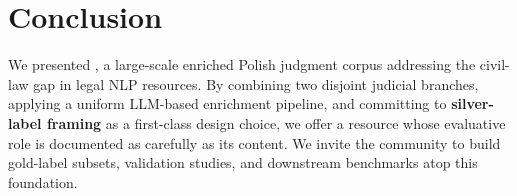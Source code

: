 
\section{Conclusion}
\label{sec:conclusion}

We presented \juddgespl{}, a large-scale enriched Polish judgment corpus addressing the civil-law gap in legal NLP resources. By combining two disjoint judicial branches, applying a uniform LLM-based enrichment pipeline, and committing to \textbf{silver-label framing} as a first-class design choice, we offer a resource whose evaluative role is documented as carefully as its content. We invite the community to build gold-label subsets, validation studies, and downstream benchmarks atop this foundation.
